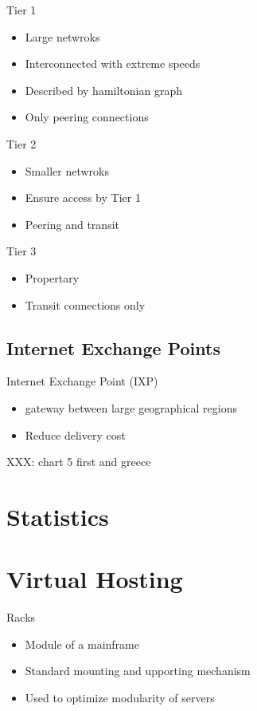 \documentclass[arial,pdftex]{beamer}
\begin{document}
\begin{frame}{Tier 1}
  \begin{itemize}
  \item Large netwroks
  \item Interconnected with extreme speeds
  \item Described by hamiltonian graph
  \item Only peering connections
  \end{itemize}
\end{frame}


\begin{frame}{Tier 2}
  \begin{itemize}
  \item Smaller netwroks \pause
  \item Ensure access by Tier 1\pause
  \item Peering and transit\pause
  \end{itemize}
\end{frame}

\begin{frame}{Tier 3}
  \begin{itemize}
  \item Propertary
  \item Transit connections only
  \end{itemize}
\end{frame}

\subsection{Internet Exchange Points}
\begin{frame}{Internet Exchange Point (IXP)}
  \begin{itemize}
  \item gateway between large geographical regions
  \item Reduce delivery cost
  \end{itemize}
  XXX: chart 5 first and greece
\end{frame}

\section{Statistics}

\section{Virtual Hosting}
\begin{frame}{Racks}
  \begin{itemize}
  \item Module of a mainframe
  \item Standard mounting and upporting mechanism
  \item Used to optimize modularity of servers
  \end{itemize}
\end{frame}
\end{document}
